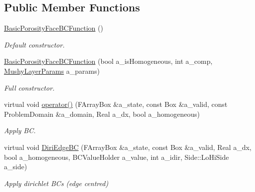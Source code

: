 \subsection*{Public Member Functions}
\begin{DoxyCompactItemize}
\item 
\hypertarget{class_basic_porosity_face_b_c_function_ab5396c22ad216f75d2fbb347acd9bf84}{\hyperlink{class_basic_porosity_face_b_c_function_ab5396c22ad216f75d2fbb347acd9bf84}{Basic\-Porosity\-Face\-B\-C\-Function} ()}\label{class_basic_porosity_face_b_c_function_ab5396c22ad216f75d2fbb347acd9bf84}

\begin{DoxyCompactList}\small\item\em Default constructor. \end{DoxyCompactList}\item 
\hypertarget{class_basic_porosity_face_b_c_function_a4708f3e4f6ea96cacc3c88572016b558}{\hyperlink{class_basic_porosity_face_b_c_function_a4708f3e4f6ea96cacc3c88572016b558}{Basic\-Porosity\-Face\-B\-C\-Function} (bool a\-\_\-is\-Homogeneous, int a\-\_\-comp, \hyperlink{class_mushy_layer_params}{Mushy\-Layer\-Params} a\-\_\-params)}\label{class_basic_porosity_face_b_c_function_a4708f3e4f6ea96cacc3c88572016b558}

\begin{DoxyCompactList}\small\item\em Full constructor. \end{DoxyCompactList}\item 
\hypertarget{class_basic_porosity_face_b_c_function_a7857900239199df879ef7a29400ea747}{virtual void \hyperlink{class_basic_porosity_face_b_c_function_a7857900239199df879ef7a29400ea747}{operator()} (F\-Array\-Box \&a\-\_\-state, const Box \&a\-\_\-valid, const Problem\-Domain \&a\-\_\-domain, Real a\-\_\-dx, bool a\-\_\-homogeneous)}\label{class_basic_porosity_face_b_c_function_a7857900239199df879ef7a29400ea747}

\begin{DoxyCompactList}\small\item\em Apply B\-C. \end{DoxyCompactList}\item 
\hypertarget{class_basic_porosity_face_b_c_function_a441775c8268a484430a069ac9eec7b31}{virtual void \hyperlink{class_basic_porosity_face_b_c_function_a441775c8268a484430a069ac9eec7b31}{Diri\-Edge\-B\-C} (F\-Array\-Box \&a\-\_\-state, const Box \&a\-\_\-valid, Real a\-\_\-dx, bool a\-\_\-homogeneous, B\-C\-Value\-Holder a\-\_\-value, int a\-\_\-idir, Side\-::\-Lo\-Hi\-Side a\-\_\-side)}\label{class_basic_porosity_face_b_c_function_a441775c8268a484430a069ac9eec7b31}

\begin{DoxyCompactList}\small\item\em Apply dirichlet B\-Cs (edge centred) \end{DoxyCompactList}\end{DoxyCompactItemize}
